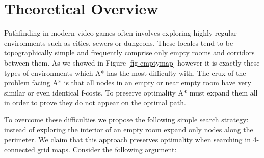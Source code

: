 \section{Theoretical Overview}
Pathfinding in modern video games often involves exploring highly regular 
\label{algorithm}
environments such as cities, sewers or dungeons.
These locales tend to be topographically simple and frequently comprise only
empty rooms and corridors between them.
As we showed in Figure \ref{fig-emptymap} however it is exactly these 
types of environments which A* has the most difficulty with.
The crux of the problem facing A* is that all nodes in an empty or near 
empty room have very similar or even identical f-costs.
To preserve optimality A* must expand them all in order to prove they do 
not appear on the optimal path.
\par
To overcome these difficulties we propose the following simple search strategy:
instead of exploring the interior of an empty room expand only nodes along the
perimeter. We claim that this approach preserves optimality when searching in 
4-connected grid maps. 
Consider the following argument:

